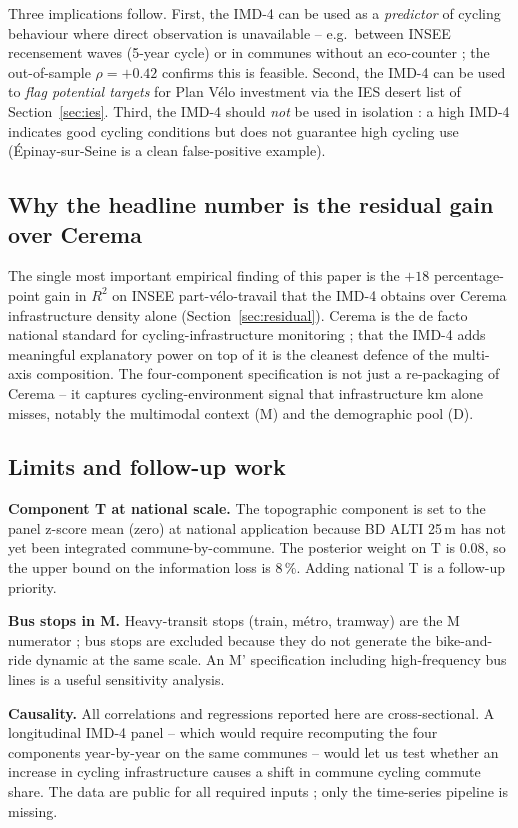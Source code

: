 \documentclass[11pt,a4paper]{article}
\begin{document}
Three implications follow.  First, the IMD-4 can be used as a
\emph{predictor} of cycling behaviour where direct observation is
unavailable -- e.g.\ between INSEE recensement waves (5-year
cycle) or in communes without an eco-counter ; the out-of-sample
$\rho = +0.42$ confirms this is feasible.  Second, the IMD-4 can
be used to \emph{flag potential targets} for Plan V\'elo
investment via the IES desert list of
Section~\ref{sec:ies}.  Third, the IMD-4 should \emph{not} be
used in isolation : a high IMD-4 indicates good cycling conditions
but does not guarantee high cycling use (\'Epinay-sur-Seine is a
clean false-positive example).

\subsection{Why the headline number is the residual gain over Cerema}

The single most important empirical finding of this paper is the
$+18$ percentage-point gain in $R^2$ on INSEE part-v\'elo-travail
that the IMD-4 obtains over Cerema infrastructure density alone
(Section~\ref{sec:residual}).  Cerema is the de facto national
standard for cycling-infrastructure monitoring ; that the IMD-4
adds meaningful explanatory power on top of it is the cleanest
defence of the multi-axis composition.  The four-component
specification is not just a re-packaging of Cerema -- it captures
cycling-environment signal that infrastructure km alone misses,
notably the multimodal context (M) and the demographic pool (D).

\subsection{Limits and follow-up work}

\textbf{Component T at national scale.}  The topographic component
is set to the panel z-score mean (zero) at national application
because BD ALTI 25\,m has not yet been integrated commune-by-commune.
The posterior weight on T is $0.08$, so the upper bound on the
information loss is $8\,\%$.  Adding national T is a follow-up
priority.

\textbf{Bus stops in M.}  Heavy-transit stops (train, m\'etro,
tramway) are the M numerator ; bus stops are excluded because they
do not generate the bike-and-ride dynamic at the same scale.  An
M' specification including high-frequency bus lines is a useful
sensitivity analysis.

\textbf{Causality.}  All correlations and regressions reported here
are cross-sectional.  A longitudinal IMD-4 panel -- which would
require recomputing the four components year-by-year on the same
communes -- would let us test whether an increase in cycling
infrastructure causes a shift in commune cycling commute share.
The data are public for all required inputs ; only the time-series
pipeline is missing.
\end{document}
